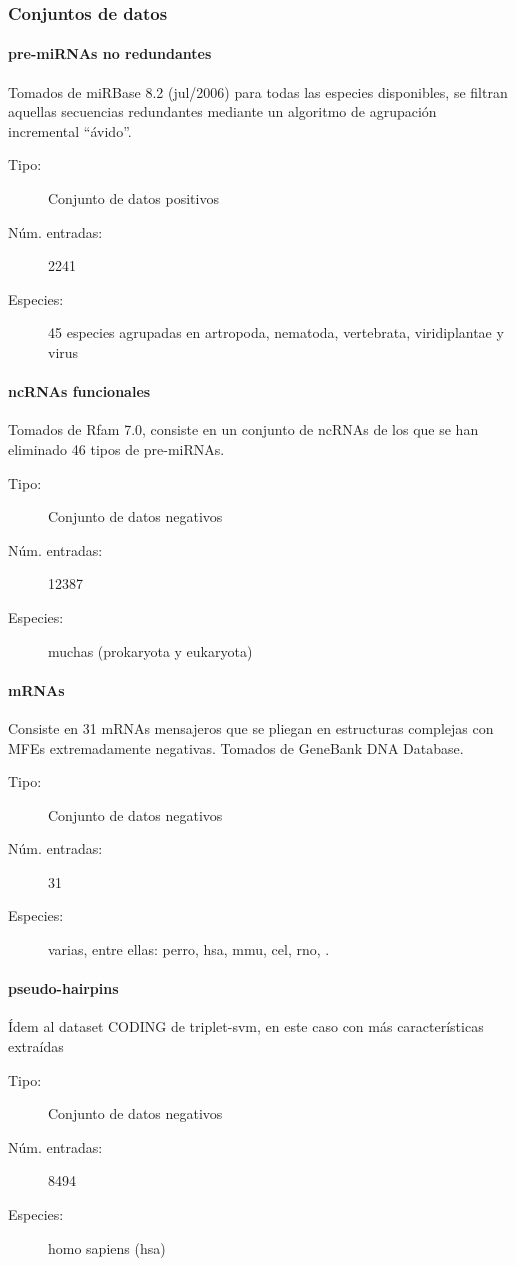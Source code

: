 \documentclass[12pt,bibliography=oldstyle,DIV=12,parskip=half-,titlepage]{scrartcl}
\begin{document}
\subsubsection{Conjuntos de datos}
\paragraph{pre-miRNAs no redundantes}
Tomados de miRBase 8.2 (jul/2006) para todas las especies disponibles,
se filtran aquellas secuencias redundantes mediante un algoritmo de
agrupación incremental ``ávido''\cite{greedy}.
\begin{description}
\item[Tipo:] Conjunto de datos positivos
\item[Núm. entradas:] 2241
\item[Especies:] 45 especies agrupadas en artropoda, nematoda,
  vertebrata, viridiplantae y virus
\end{description}

\paragraph{ncRNAs funcionales}
Tomados de Rfam 7.0, consiste en un conjunto de ncRNAs de los que se
han eliminado 46 tipos de pre-miRNAs.
\begin{description}
\item[Tipo:] Conjunto de datos negativos
\item[Núm. entradas:] 12387
\item[Especies:] muchas (prokaryota y eukaryota)
\end{description}

\paragraph{mRNAs}
Consiste en 31 mRNAs mensajeros que se pliegan en estructuras
complejas con MFEs extremadamente negativas. Tomados de GeneBank DNA
Database.
\begin{description}
\item[Tipo:] Conjunto de datos negativos
\item[Núm. entradas:] 31
\item[Especies:] varias, entre ellas: perro, hsa, mmu, cel, rno,
  \textellipsis.
\end{description}

\paragraph{pseudo-hairpins}
Ídem al dataset CODING de triplet-svm, en este caso con más
características extraídas
\begin{description}
\item[Tipo:] Conjunto de datos negativos
\item[Núm. entradas:] 8494
\item[Especies:] homo sapiens (hsa)
\end{description}
%
%
%
%
%
\end{document}
